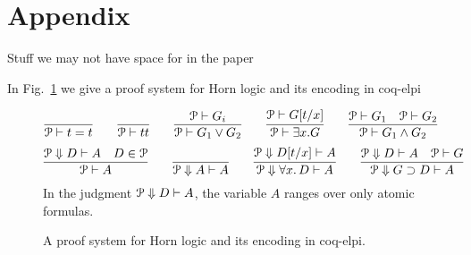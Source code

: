 
\section{Appendix}
\label{sec:app}

Stuff we may not have space for in the paper


In Fig.~\ref{fig:interp} we give a proof system for Horn logic and its encoding in coq-elpi

\begin{figure}
\newcommand{\XXi}{\Pscr}
\newcommand{\bc}[2]{\Pscr\Downarrow #1 \vdash #2}
\[
\infer{\XXi\vdash t = t}
{%
}
\qquad
\infer{\XXi\vdash \true}
{%
}
\qquad
\infer{\XXi\vdash G_1\vee G_2}
{\XXi\vdash G_i%
}
\qquad
\infer{\XXi\vdash \exists x. G}
{\XXi\vdash G[t/x]%
}
\qquad 
\infer{\XXi\vdash G_1\wedge G_2}
{\XXi\vdash G_1\quad \XXi\vdash G_2%
}
\]
\vskip -18pt
\[
\infer{\XXi\vdash A}
      {\bc D A \quad D \in \Pscr}\qquad
  \infer{\bc A A}{}{}\qquad
  \infer{\bc{\forall x.\, D} A}{\bc{D[t/x]} A}{}\qquad
  \infer{\bc{G\supset D} A}{\bc D A\quad \XXi\vdash G}{}
\]
In the judgment $\bc{D}{A}$, the variable $A$ ranges over only atomic
formulas.

\caption{A proof system for Horn logic and its encoding in coq-elpi.}
\label{fig:interp}
%
%
\end{figure}


